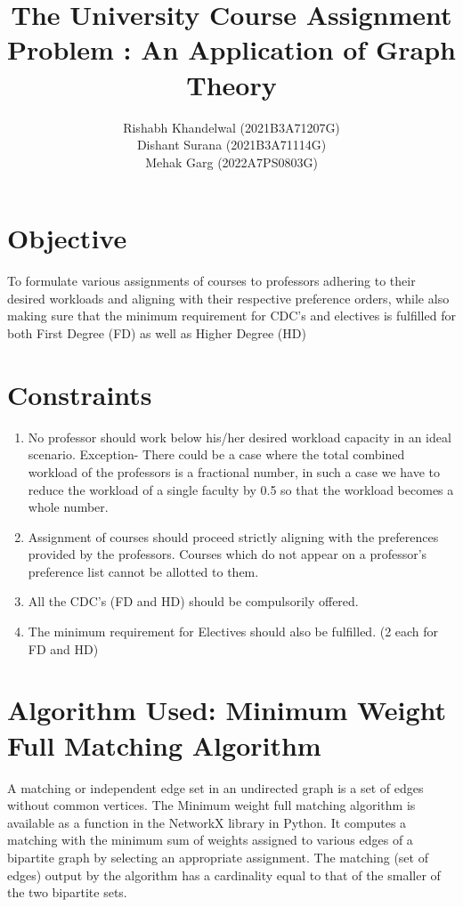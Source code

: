 \documentclass{article}
\title{The University Course Assignment Problem : An Application of Graph Theory}
\author{Rishabh Khandelwal (2021B3A71207G) \\ Dishant  Surana (2021B3A71114G) \\ Mehak Garg (2022A7PS0803G)}
\begin{document}
\maketitle

\section{Objective}
To formulate various assignments of courses to professors adhering to their desired workloads and aligning with their respective preference orders, while also making sure that the minimum requirement for CDC's and electives is fulfilled for both First Degree (FD) as well as Higher Degree (HD)

\section{Constraints}
\begin{enumerate}
    \item No professor should work below his/her desired workload capacity in an ideal scenario. Exception- There could be a case where the total combined workload of the professors is a fractional number, in such a case we have to reduce the workload of a single faculty by 0.5 so that the workload becomes a whole number.
    \item Assignment of courses should proceed strictly aligning with the preferences provided by the professors. Courses which do not appear on a professor's preference list cannot be allotted to them.
    \item All the CDC’s (FD and HD) should be compulsorily offered.
    \item The minimum requirement for Electives should also be fulfilled. (2 each for FD and HD)
\end{enumerate}

\section{Algorithm Used: Minimum Weight Full Matching Algorithm}
A matching or independent edge set in an undirected graph is a set of edges without common vertices. The Minimum weight full matching algorithm is available as a function in the NetworkX library in Python. It computes a matching with the minimum sum of weights assigned to various edges of a bipartite graph by selecting an appropriate assignment. The matching (set of edges) output by the algorithm has a cardinality equal to that of the smaller of the two bipartite sets.
\end{document}

